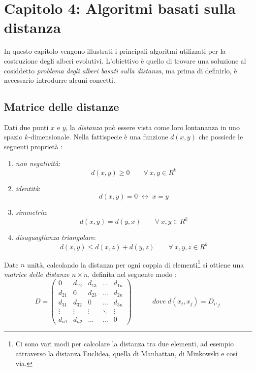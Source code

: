\chapter{Capitolo 4: Algoritmi basati sulla distanza}
In questo capitolo vengono illustrati i principali algoritmi utilizzati per la costruzione degli alberi evolutivi. L'obiettivo è quello di trovare una soluzione al cosiddetto \textit{problema degli alberi basati sulla distanza}, ma prima di definirlo, è necessario introdurre alcuni concetti.

\section{Matrice delle distanze}
Dati due punti $x$ e $y$, la \textit{distanza} può essere vista come loro lontananza in uno spazio $k$-dimensionale. Nella fattispecie è una funzione $d(x,y)$ che possiede le seguenti proprietà \cite{dataMiningInBioinformatics}:
\begin{enumerate}
	\item \textit{non negatività}:
	\[d(x,y)\geq 0\hspace{2em} \forall \: x,y\in R^k\]
	\item \textit{identità}:
	\[d(x,y)=0 \; \leftrightarrow \; x=y\]
	\item \textit{simmetria}:
	\[d(x,y)=d(y,x)\hspace{2em} \forall \: x,y\in R^k\]
	\item \textit{disuguaglianza triangolare}:
	\[d(x,y)\leq d(x,z)+d(y,z)\hspace{2em} \forall \: x,y,z\in R^k\]
\end{enumerate}
Date $n$ unità, calcolando la distanza per ogni coppia di elementi\footnote{Ci sono vari modi per calcolare la distanza tra due elementi, ad esempio attraverso la distanza Euclidea, quella di Manhattan, di Minkowski e così via.} si ottiene una \textit{matrice delle distanze $n \times n$}, definita nel seguente modo \cite{introductionbioinfalg}:
\[
D = \begin{pmatrix}
0 & d_{12} & d_{13} & \ldots & d_{1n} \\ 
d_{21} & 0 & d_{23} & \ldots & d_{2n} \\ 
d_{31} & d_{32} & 0 & \ldots & d_{3n} \\ 
\vdots & \vdots & \vdots & \ddots & \vdots \\ 
d_{n1} & d_{n2} & \ldots & \ldots & 0
\end{pmatrix}
\hspace{3em}dove\;d(x_i,x_j)=D_i,_j
\]
